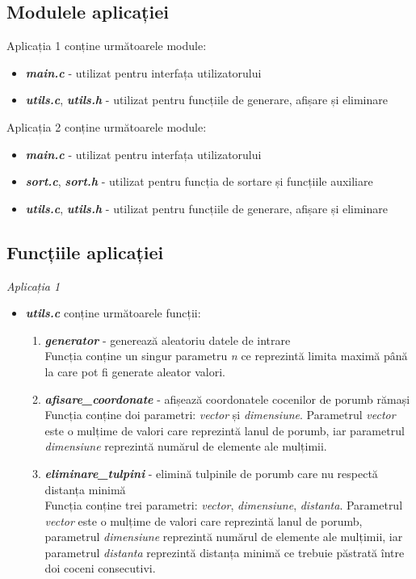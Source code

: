 \documentclass[11pt,a4paper]{article}
\begin{document}
    
\subsection{Modulele aplicației}
 
  Aplicația 1 conține următoarele module:
\begin{itemize}
  \item \textbf{\textit{main.c}} - utilizat pentru interfața utilizatorului
  \item \textbf{\textit{utils.c}}, \textbf{\textit{utils.h}} - utilizat pentru funcțiile de generare, afișare și eliminare 
\end{itemize}

\noindent Aplicația 2 conține următoarele module:

\begin{itemize}
  \item \textbf{\textit{main.c}} - utilizat pentru interfața utilizatorului
  \item \textbf{\textit{sort.c}}, \textbf{\textit{sort.h}} - utilizat pentru funcția de sortare și funcțiile auxiliare
  \item \textbf{\textit{utils.c}}, \textbf{\textit{utils.h}} - utilizat pentru funcțiile de generare, afișare și eliminare 
\end{itemize}

\subsection{Funcțiile aplicației}

    \emph{Aplicația 1}
\begin{itemize}
    \item \textbf{\textit{utils.c}} conține următoarele funcții: 
    \begin{enumerate}
        \item \textbf{\textit{generator}} - generează aleatoriu datele de intrare  \\
        Funcția conține un singur parametru \emph{n} ce reprezintă limita maximă până la care pot fi generate aleator valori.
        \item \textbf{\textit{afisare\_coordonate}} - afișează coordonatele cocenilor de porumb rămași \\
        Funcția conține doi parametri: \emph{vector} și \emph{dimensiune}. Parametrul \emph{vector} este o mulțime de valori care reprezintă lanul de porumb, iar parametrul \emph{dimensiune} reprezintă numărul de elemente ale mulțimii.
        \item \textbf{\textit{eliminare\_tulpini}} - elimină tulpinile de porumb care nu respectă distanța minimă \\
        Funcția conține trei parametri: \emph{vector}, \emph{dimensiune}, \emph{distanta}. Parametrul \emph{vector} este o mulțime de valori care reprezintă lanul de porumb, parametrul \emph{dimensiune} reprezintă numărul de elemente ale mulțimii, iar parametrul \emph{distanta} reprezintă distanța minimă ce trebuie păstrată între doi coceni consecutivi.
    \end{enumerate}
\end{itemize} 
 
\end{document}
